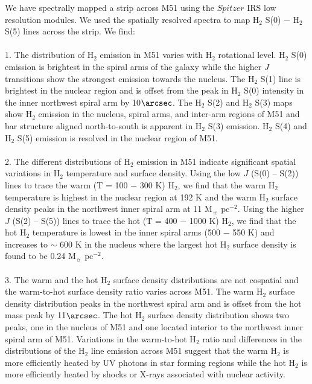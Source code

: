 \documentclass[12pt,preprint]{aastex}
\begin{document}
We have spectrally mapped a strip across M51 using the $Spitzer$ IRS
low resolution modules.  We used the spatially resolved spectra to map
H$_2$ S(0) $-$ H$_2$ S(5) lines across
the strip.  We find:\\
\\
1.  The distribution of H$_2$
emission in M51 varies with H$_2$ rotational level.
H$_2$ S(0) emission is brightest in the spiral arms of the
galaxy while the higher $J$ transitions show the strongest emission
towards the nucleus.  The H$_2$ S(1) line is brightest
in the nuclear region and is offset from the peak in H$_2$ S(0) 
intensity in the inner northwest spiral arm by 10$\arcsec$.
The H$_2$ S(2) and H$_2$ S(3) maps show
H$_2$ emission in the nucleus, spiral arms, and inter-arm
regions of M51 and bar structure aligned north-to-south is apparent in
H$_2$ S(3) emission.  H$_2$ S(4) and H$_2$
S(5) emission is resolved in the nuclear region of M51.\\
\\
2.  The different distributions of H$_2$ emission in M51
indicate significant spatial variations in H$_2$
temperature and surface density.  Using the low $J$ (S(0) -- S(2)) lines to trace the warm (T = 100
$-$ 300 K) H$_2$, we find that the warm H$_2$
temperature is highest in the nuclear region at 192 K and
the warm H$_2$ surface density peaks in the northwest inner spiral arm
at 11 $\mathrm{M_\sun}$ $\mathrm{pc^{-2}}$.  Using the
higher $J$ (S(2) -- S(5)) lines to trace the hot (T = 400 $-$ 1000 K) H$_2$,
we find that the hot H$_2$ temperature is lowest
in the inner spiral arms (500 $-$ 550 K) and increases to $\sim$ 600 K
in the nucleus where the largest hot H$_2$ surface density
is found to be 0.24 $\mathrm{M_\sun}$ $\mathrm{pc^{-2}}$.\\
\\
3.  The warm and the hot H$_2$ surface density distributions are not
cospatial and the warm-to-hot surface density ratio varies across M51.  The warm
H$_2$ surface density distribution peaks in the northwest spiral arm and is offset from
the hot mass peak by 11$\arcsec$.  The hot H$_2$ surface density distribution 
shows two peaks, one in the nucleus of M51 and one located interior to the 
northwest inner spiral arm of M51.   Variations in the
warm-to-hot H$_2$ ratio and differences in the
distributions of the H$_2$ line emission across 
M51 suggest that the warm H$_2$ is more efficiently heated 
by UV photons in star forming regions while the hot H$_2$ is 
more efficiently heated by shocks or X-rays associated with nuclear activity.\\
\end{document}
